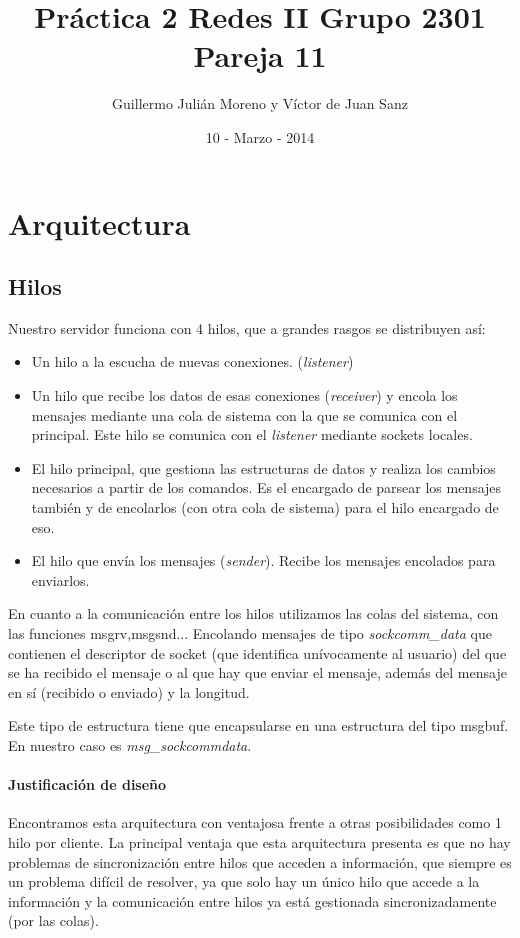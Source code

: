 \documentclass[nochap]{apuntes}
\title{Práctica 2 Redes II Grupo 2301 Pareja 11}
\author{ Guillermo Julián Moreno  y Víctor de Juan Sanz}
\date{10 - Marzo - 2014}
\begin{document}
\maketitle
\newpage
\tableofcontents
\newpage

\section{Arquitectura}

\subsection{Hilos}
Nuestro servidor funciona con 4 hilos, que a grandes rasgos se distribuyen así:
\begin{itemize}
\item  Un hilo a la escucha de nuevas conexiones. (\emph{listener})
\item Un hilo que recibe los datos de esas conexiones (\emph{receiver}) y encola los mensajes mediante una cola de sistema con la que se comunica con el principal. Este hilo se comunica con el \emph{listener} mediante sockets locales.
\item El hilo principal, que gestiona las estructuras de datos y realiza los cambios necesarios a partir de los comandos. Es el encargado de parsear los mensajes también y de encolarlos (con otra cola de sistema) para el hilo encargado de eso.
\item El hilo que envía los mensajes (\emph{sender}). Recibe los mensajes encolados para enviarlos.
\end{itemize}

En cuanto a la comunicación entre los hilos utilizamos las colas del sistema, con las funciones msgrv,msgsnd... Encolando mensajes de tipo \textit{sockcomm\_data} que contienen el descriptor de socket (que identifica unívocamente al usuario) del que se ha recibido el mensaje o al que hay que enviar el mensaje, además del mensaje en sí (recibido o enviado) y la longitud. 

Este tipo de estructura tiene que encapsularse en una estructura del tipo msgbuf. En nuestro caso es \textit{msg\_sockcommdata}.

\paragraph{Justificación de diseño}

Encontramos esta arquitectura con ventajosa frente a otras posibilidades como 1 hilo por cliente. La principal ventaja que esta arquitectura presenta es que no hay problemas de sincronización entre hilos que acceden a información, que siempre es un problema difícil de resolver, ya que solo hay un único hilo que accede a la información y la comunicación entre hilos ya está gestionada sincronizadamente (por las colas).
\end{document}
